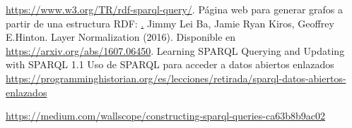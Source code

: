 \documentclass[conference]{IEEEtran}
\begin{document}
\begin{thebibliography}{00}
\href{https://arxiv.org/abs/1502.03167}{https://www.w3.org/TR/rdf-sparql-query/}. 
Página web para generar grafos a partir de una estructura RDF: \href{https://www.ldf.fi/service/rdf-grapher}.
 Jimmy Lei Ba, Jamie Ryan Kiros, Geoffrey E.Hinton. Layer Normalization (2016). Disponible en \href{https://arxiv.org/abs/1607.06450}{https://arxiv.org/abs/1607.06450}.
Learning SPARQL
Querying and Updating with SPARQL 1.1
Uso de SPARQL para acceder a datos abiertos enlazados \href{https://programminghistorian.org/es/lecciones/retirada/sparql-datos-abiertos-enlazados}{https://programminghistorian.org/es/lecciones/retirada/sparql-datos-abiertos-enlazados}

\href{https://medium.com/wallscope/constructing-sparql-queries-ca63b8b9ac02}{https://medium.com/wallscope/constructing-sparql-queries-ca63b8b9ac02}

\end{thebibliography}
\end{document}
